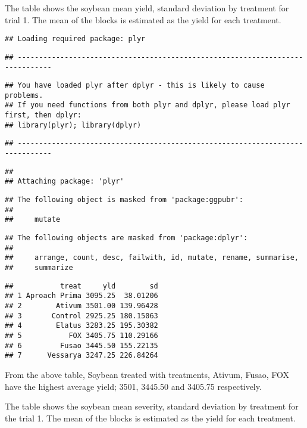\documentclass[
]{article}
\begin{document}
The table shows the soybean mean yield, standard deviation by treatment
for trial 1. The mean of the blocks is estimated as the yield for each
treatment.

\begin{verbatim}
## Loading required package: plyr
\end{verbatim}

\begin{verbatim}
## ------------------------------------------------------------------------------
\end{verbatim}

\begin{verbatim}
## You have loaded plyr after dplyr - this is likely to cause problems.
## If you need functions from both plyr and dplyr, please load plyr first, then dplyr:
## library(plyr); library(dplyr)
\end{verbatim}

\begin{verbatim}
## ------------------------------------------------------------------------------
\end{verbatim}

\begin{verbatim}
## 
## Attaching package: 'plyr'
\end{verbatim}

\begin{verbatim}
## The following object is masked from 'package:ggpubr':
## 
##     mutate
\end{verbatim}

\begin{verbatim}
## The following objects are masked from 'package:dplyr':
## 
##     arrange, count, desc, failwith, id, mutate, rename, summarise,
##     summarize
\end{verbatim}

\begin{verbatim}
##           treat     yld        sd
## 1 Aproach Prima 3095.25  38.01206
## 2        Ativum 3501.00 139.96428
## 3       Control 2925.25 180.15063
## 4        Elatus 3283.25 195.30382
## 5           FOX 3405.75 110.29166
## 6         Fusao 3445.50 155.22135
## 7      Vessarya 3247.25 226.84264
\end{verbatim}

From the above table, Soybean treated with treatments, Ativum, Fusao,
FOX have the highest average yield; 3501, 3445.50 and 3405.75
respectively.

The table shows the soybean mean severity, standard deviation by
treatment for the trial 1. The mean of the blocks is estimated as the
yield for each treatment.
\end{document}
